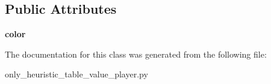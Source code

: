 \subsection*{Public Attributes}
\begin{DoxyCompactItemize}
\item 
\hypertarget{class_tabuleiro_othello-fork_1_1models_1_1players_1_1only__heuristic__table__value__player_1_1_heuristcvalue_player_a86f0bd5efe2c5da31dc0cfe8d10225d3}{}{\bfseries color}\label{class_tabuleiro_othello-fork_1_1models_1_1players_1_1only__heuristic__table__value__player_1_1_heuristcvalue_player_a86f0bd5efe2c5da31dc0cfe8d10225d3}

\end{DoxyCompactItemize}


The documentation for this class was generated from the following file\+:\begin{DoxyCompactItemize}
\item 
only\+\_\+heuristic\+\_\+table\+\_\+value\+\_\+player.\+py\end{DoxyCompactItemize}
